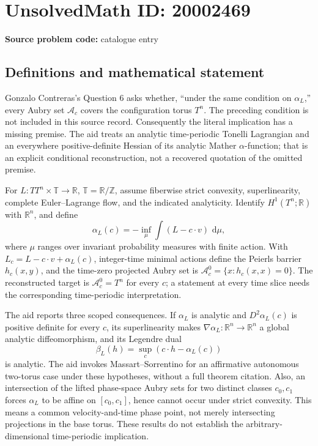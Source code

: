 \documentclass[11pt]{article}
\newcommand{\Z}{\mathbb{Z}}
\newcommand{\R}{\mathbb{R}}
\newcommand{\dd}{\,\mathrm{d}}
\begin{document}
\section*{UnsolvedMath ID: 20002469}
\textbf{Source problem code:} catalogue entry
\subsection{Definitions and mathematical statement}
Gonzalo Contreras's Question 6 asks whether, ``under the same condition on \(\alpha_L\),'' every Aubry set \(\mathcal A_c\) covers the configuration torus \(T^n\). The preceding condition is not included in this source record. Consequently the literal implication has a missing premise. The aid treats an analytic time-periodic Tonelli Lagrangian and an everywhere positive-definite Hessian of its analytic Mather \(\alpha\)-function; that is an explicit conditional reconstruction, not a recovered quotation of the omitted premise.

For \(L:TT^n\times\mathbb T\to\R\), \(\mathbb T=\R/\Z\), assume fiberwise strict convexity, superlinearity, complete Euler--Lagrange flow, and the indicated analyticity. Identify \(H^1(T^n;\R)\) with \(\R^n\), and define
\[
 \alpha_L(c)=-\inf_\mu\int(L-c\cdot v)\,\dd\mu,
\]
where \(\mu\) ranges over invariant probability measures with finite action. With \(L_c=L-c\cdot v+\alpha_L(c)\), integer-time minimal actions define the Peierls barrier \(h_c(x,y)\), and the time-zero projected Aubry set is \(\mathcal A_c^0=\{x:h_c(x,x)=0\}\). The reconstructed target is \(\mathcal A_c^0=T^n\) for every \(c\); a statement at every time slice needs the corresponding time-periodic interpretation.

The aid reports three scoped consequences. If \(\alpha_L\) is analytic and \(D^2\alpha_L(c)\) is positive definite for every \(c\), its superlinearity makes \(\nabla\alpha_L:\R^n\to\R^n\) a global analytic diffeomorphism, and its Legendre dual
\[
 \beta_L(h)=\sup_c(c\cdot h-\alpha_L(c))
\]
is analytic. The aid invokes Massart--Sorrentino for an affirmative autonomous two-torus case under these hypotheses, without a full theorem citation. Also, an intersection of the lifted phase-space Aubry sets for two distinct classes \(c_0,c_1\) forces \(\alpha_L\) to be affine on \([c_0,c_1]\), hence cannot occur under strict convexity. This means a common velocity-and-time phase point, not merely intersecting projections in the base torus. These results do not establish the arbitrary-dimensional time-periodic implication.
\end{document}

